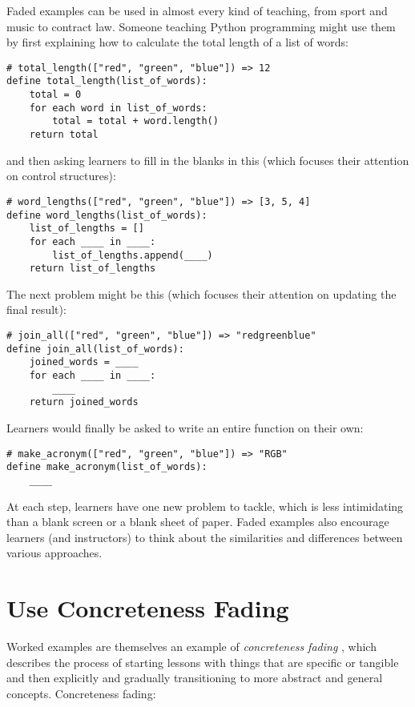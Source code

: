 \documentclass[10pt,letterpaper]{article}
\newcommand{\rulemajor}[1]{\section{#1}}
\begin{document}
Faded examples can be used in almost every kind of teaching, from sport and
music to contract law. Someone teaching Python programming might use them by
first explaining how to calculate the total length of a list of words:

\begin{verbatim}
# total_length(["red", "green", "blue"]) => 12
define total_length(list_of_words):
    total = 0
    for each word in list_of_words:
        total = total + word.length()
    return total
\end{verbatim}

and then asking learners to fill in the blanks in this (which focuses their
attention on control structures):

\begin{verbatim}
# word_lengths(["red", "green", "blue"]) => [3, 5, 4]
define word_lengths(list_of_words):
    list_of_lengths = []
    for each ____ in ____:
        list_of_lengths.append(____)
    return list_of_lengths
\end{verbatim}

The next problem might be this (which focuses their attention on updating the
final result):

\begin{verbatim}
# join_all(["red", "green", "blue"]) => "redgreenblue"
define join_all(list_of_words):
    joined_words = ____
    for each ____ in ____:
        ____
    return joined_words
\end{verbatim}

Learners would finally be asked to write an entire function on their own:

\begin{verbatim}
# make_acronym(["red", "green", "blue"]) => "RGB"
define make_acronym(list_of_words):
    ____
\end{verbatim}

At each step, learners have one new problem to tackle, which is less
intimidating than a blank screen or a blank sheet of paper.  Faded examples also
encourage learners (and instructors) to think about the similarities and
differences between various approaches.

\rulemajor{Use Concreteness Fading}

Worked examples are themselves an example of \emph{concreteness fading}
\cite{Gold2005,Fyfe2014}, which describes the process of starting lessons with
things that are specific or tangible and then explicitly and gradually
transitioning to more abstract and general concepts.  Concreteness fading:
\end{document}
